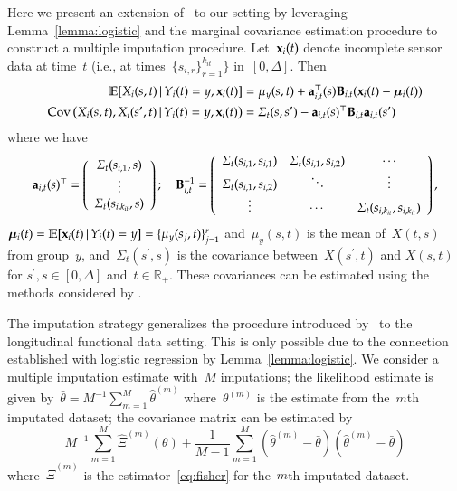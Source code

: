 \documentclass[12pt]{amsart}
\def\E{\mathcal{E}}
\def\E{\mathbb{E}}
\def\given{\, | \,}
\def\bfx{{\bf x}}
\begin{document}
Here we present an extension of~\cite{Petrovich2018} to our setting by
leveraging Lemma~\ref{lemma:logistic} and the marginal covariance
estimation procedure to construct a multiple imputation procedure.
Let~$\bfx_{i} (t)$ denote incomplete sensor data at time~$t$ (i.e., at
times~$\{ s_{i,r} \}_{r=1}^{k_{it}} \}$ in~$[0,\Delta]$. Then
\begin{align}
\label{eq:impute}
\E [ X_i (s,t) \given Y_i(t) = y, \bfx_i (t) ] 
  &= \mu_y (s,t) + {\bf a}_{i,t}^\top (s) {\bf B}_{i,t} (\bfx_i (t) -
    \mathbold{\mu}_i (t) ) \\
\text{Cov} \left( X_i (s,t), X_i (s^\prime, t) \given Y_i (t) = y,
  \bfx_i (t) \right) 
  &= \Sigma_{t} (s, s^\prime) - 
    {\bf a}_{i,t} (s)^\top {\bf B}_{i,t} {\bf a}_{i,t} (s^\prime)
\end{align}
where we have
\[
{\bf a}_{i,t} (s)^\top = \left( \begin{array}{c} \Sigma_t (s_{i,1}, s) \\ \vdots \\
                       \Sigma_t (s_{i,k_{it}}, s) \end{array} \right); \quad
{\bf B}_{i,t}^{-1} = \left( 
  \begin{array}{c c c} 
    \Sigma_t(s_{i,1}, s_{i,1}) & \Sigma_t(s_{i,1}, s_{i,2}) & \cdots \\
    \Sigma_t(s_{i,1}, s_{i,2}) & \ddots & \vdots \\
    \vdots & \cdots & \Sigma_t (s_{i,k_{it}}, s_{i,k_{it}}) 
  \end{array} \right),
\]
$\mathbold{\mu}_i (t) = \E [ \bfx_i (t) \given Y_i (t) = y] = \{
\mu_y (s_{j}, t) \}_{j=1}^r$ and~$\mu_y (s,t)$ is the mean of~$X(t,s)$
from group~$y$, and~$\Sigma_t ( s^\prime, s)$ is the covariance
between~$X(s^\prime,t)$ and $X(s,t)$ for $s^\prime, s \in [0, \Delta]$ 
and~$t \in \mathbb{R}_+$.
These covariances can be estimated using the methods considered by
\cite{ChenMuller2012}.  

The imputation strategy generalizes the procedure introduced
by~\cite{Petrovich2018} to the longitudinal functional data
setting.  This is only possible due to the connection established with
logistic regression by Lemma~\ref{lemma:logistic}.
We consider a multiple imputation estimate with~$M$ imputations;
the likelihood estimate is given by~$\bar \theta = M^{-1}
\sum_{m=1}^M \hat \theta^{(m)}$ where~$\theta^{(m)}$ is the estimate
from the~$m$th imputated dataset; the covariance matrix can be
estimated by 
\[
M^{-1} \sum_{m=1}^M \hat \Xi^{(m)} (\theta) + \frac{1}{M-1}
\sum_{m=1}^M (\hat \theta^{(m)} - \bar \theta) (\hat \theta^{(m)} -
\bar \theta)
\]
where~$\hat \Xi^{(m)}$ is the estimator~\eqref{eq:fisher} for
the~$m$th imputated dataset.
\end{document}
